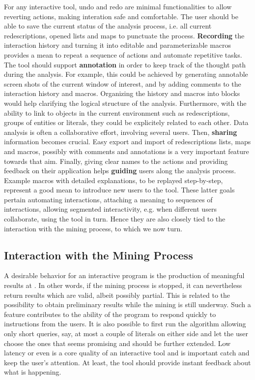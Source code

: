 For any interactive tool, undo and redo are minimal functionalities to
allow reverting actions, making interation safe and comfortable.  The
user should be able to save the current status of the analysis
process, i.e. all current redescriptions, opened lists and maps to
punctuate the process. \textbf{Recording} the interaction history and
turning it into editable and parameterizable macros provides a mean to
repeat a sequence of actions and automate repetitive tasks.  The tool
should support \textbf{annotation} in order to keep track of the
thought path during the analysis.  For example, this could be achieved
by generating annotable screen shots of the current window of
interest, and by adding comments to the interaction history and
macros.  Organizing the history and macros into blocks would help
clarifying the logical structure of the analysis.  Furthermore, with
the ability to link to objects in the current environment such as
redescriptions, groups of entities or literals, they could be
explicitely related to each other.  Data analysis is often a
collaborative effort, involving several users. Then, \textbf{sharing}
information becomes crucial.  Easy export and import of redescriptions
lists, maps and macros, possibly with comments and annotations is a
very important feature towards that aim.  Finally, giving clear names
to the actions and providing feedback on their application helps
\textbf{guiding} users along the analysis process. Example macros with
detailed explanations, to be replayed step-by-step, represent a good
mean to introduce new users to the tool.  These latter goals pertain
automating interactions, attaching a meaning to sequences of
interactions, allowing segmented interactivity, e.g. when different
users collaborate, using the tool in turn. Hence they are also closely
tied to the interaction with the mining process, to which we now turn.

\subsection{Interaction with the Mining Process}
\label{sec:goals-interaction}

A desirable behavior for an interactive program is the production of
meaningful results at .  In other words, if the mining
process is stopped, it can nevertheless return results which are
valid, albeit possibly partial.  This is related to the possibility to
obtain preliminary results while the mining is still underway.  Such a
feature contributes to the ability of the program to respond quickly
to instructions from the users.  It is also possible to first run the
algorithm allowing only short queries, say, at most a couple of
literals on either side and let the user choose the ones that seems
promising and should be further extended. Low latency or even
 is a core quality of an interactive tool and is
important catch and keep the user's attention. At least, the tool
should provide instant feedback about what is happening.


